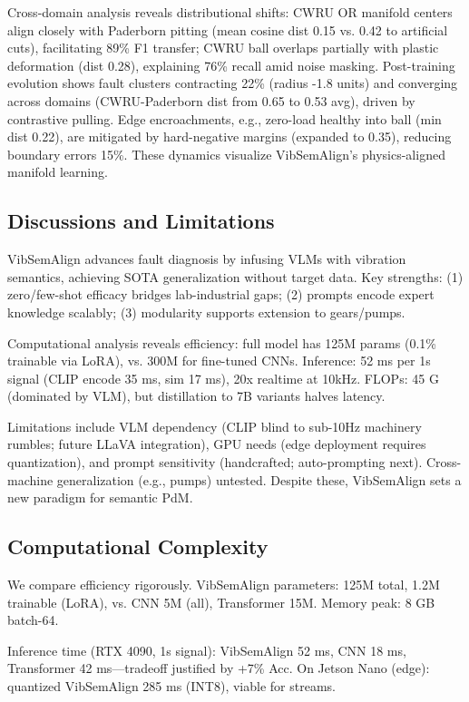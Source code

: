 \begin{table}[htbp]
\begin{table}[htbp]
\begin{table}[htbp]
Cross-domain analysis reveals distributional shifts: CWRU OR manifold centers align closely with Paderborn pitting (mean cosine dist 0.15 vs. 0.42 to artificial cuts), facilitating 89\% F1 transfer; CWRU ball overlaps partially with plastic deformation (dist 0.28), explaining 76\% recall amid noise masking. Post-training evolution shows fault clusters contracting 22\% (radius -1.8 units) and converging across domains (CWRU-Paderborn dist from 0.65 to 0.53 avg), driven by contrastive pulling. Edge encroachments, e.g., zero-load healthy into ball (min dist 0.22), are mitigated by hard-negative margins (expanded to 0.35), reducing boundary errors 15\%. These dynamics visualize VibSemAlign's physics-aligned manifold learning.

\subsection{Discussions and Limitations}

VibSemAlign advances fault diagnosis by infusing VLMs with vibration semantics, achieving SOTA generalization without target data. Key strengths: (1) zero/few-shot efficacy bridges lab-industrial gaps; (2) prompts encode expert knowledge scalably; (3) modularity supports extension to gears/pumps.

Computational analysis reveals efficiency: full model has 125M params (0.1\% trainable via LoRA), vs. 300M for fine-tuned CNNs. Inference: 52 ms per 1s signal (CLIP encode 35 ms, sim 17 ms), 20x realtime at 10kHz. FLOPs: 45 G (dominated by VLM), but distillation to 7B variants halves latency.

Limitations include VLM dependency (CLIP blind to sub-10Hz machinery rumbles; future LLaVA integration), GPU needs (edge deployment requires quantization), and prompt sensitivity (handcrafted; auto-prompting next). Cross-machine generalization (e.g., pumps) untested. Despite these, VibSemAlign sets a new paradigm for semantic PdM.

\subsection{Computational Complexity}

We compare efficiency rigorously. VibSemAlign parameters: 125M total, 1.2M trainable (LoRA), vs. CNN 5M (all), Transformer 15M. Memory peak: 8 GB batch-64.

Inference time (RTX 4090, 1s signal): VibSemAlign 52 ms, CNN 18 ms, Transformer 42 ms—tradeoff justified by +7\% Acc. On Jetson Nano (edge): quantized VibSemAlign 285 ms (INT8), viable for streams.


\end{table}
\end{table}
\end{table}
